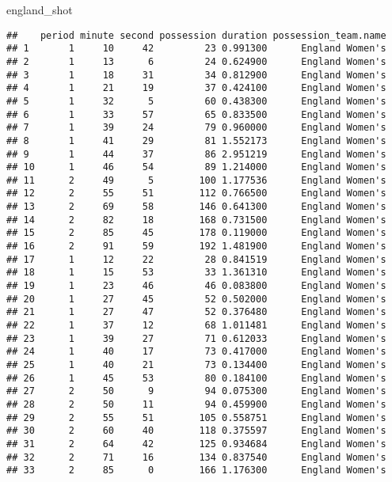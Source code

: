 \documentclass[]{article}
\newenvironment{Shaded}{\begin{snugshade}}{\end{snugshade}}
\newcommand{\NormalTok}[1]{#1}
\begin{document}
\begin{Shaded}
\begin{Highlighting}[]
\NormalTok{england_shot}
\end{Highlighting}
\end{Shaded}

\begin{verbatim}
##    period minute second possession duration possession_team.name
## 1       1     10     42         23 0.991300      England Women's
## 2       1     13      6         24 0.624900      England Women's
## 3       1     18     31         34 0.812900      England Women's
## 4       1     21     19         37 0.424100      England Women's
## 5       1     32      5         60 0.438300      England Women's
## 6       1     33     57         65 0.833500      England Women's
## 7       1     39     24         79 0.960000      England Women's
## 8       1     41     29         81 1.552173      England Women's
## 9       1     44     37         86 2.951219      England Women's
## 10      1     46     54         89 1.214000      England Women's
## 11      2     49      5        100 1.177536      England Women's
## 12      2     55     51        112 0.766500      England Women's
## 13      2     69     58        146 0.641300      England Women's
## 14      2     82     18        168 0.731500      England Women's
## 15      2     85     45        178 0.119000      England Women's
## 16      2     91     59        192 1.481900      England Women's
## 17      1     12     22         28 0.841519      England Women's
## 18      1     15     53         33 1.361310      England Women's
## 19      1     23     46         46 0.083800      England Women's
## 20      1     27     45         52 0.502000      England Women's
## 21      1     27     47         52 0.376480      England Women's
## 22      1     37     12         68 1.011481      England Women's
## 23      1     39     27         71 0.612033      England Women's
## 24      1     40     17         73 0.417000      England Women's
## 25      1     40     21         73 0.134400      England Women's
## 26      1     45     53         80 0.184100      England Women's
## 27      2     50      9         94 0.075300      England Women's
## 28      2     50     11         94 0.459900      England Women's
## 29      2     55     51        105 0.558751      England Women's
## 30      2     60     40        118 0.375597      England Women's
## 31      2     64     42        125 0.934684      England Women's
## 32      2     71     16        134 0.837540      England Women's
## 33      2     85      0        166 1.176300      England Women's

\end{verbatim}
\end{document}
